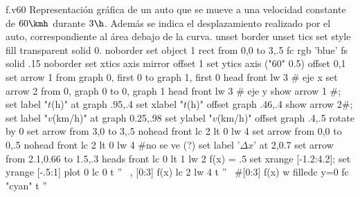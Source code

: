 \begin{plot}{.9}{f.v60}
  {Representación gráfica de un auto que se mueve a una velocidad constante de
  $60\kmh$ durante $3\h$. Además se indica el desplazamiento realizado por el
  auto, correspondiente al área debajo de la curva.}
  unset border
  unset tics
  set style fill transparent solid 0. noborder
  set object 1 rect from 0,0 to 3,.5 fc rgb 'blue' fs solid .15 noborder 
  set xtics axis mirror offset 1
  set ytics axis ("$60$" 0.5) offset 0,1
  set arrow 1 from graph 0, first 0 to graph 1, first 0 head front lw 3 # eje x
  set arrow 2 from 0, graph 0 to 0, graph 1 head front lw 3		# eje y 
  show arrow 1 #; set label "$t$(h)" at graph .95,.4
  set xlabel "$t$(h)" offset  graph .46,.4
  show arrow 2#; set label "$v$(km/h)" at graph 0.25,.98 
  set ylabel "$v$(km/h)" offset graph .4,.5 rotate by 0
  set arrow from 3,0 to 3,.5 nohead front lc 2 lt 0 lw 4
  set arrow from 0,0 to 0,.5 nohead front lc 2 lt 0 lw 4 #no se ve (?)
  set label '$\Delta x$' at 2,0.7
  set arrow from 2.1,0.66 to 1.5,.3 heads front lc 0 lt 1 lw 2
  f(x) = .5
  set xrange [-1.2:4.2]; set yrange [-.5:1]
  plot 0 lc 0 t '' \
  , [0:3] f(x) lc 2 lw 4 t '' \
  #[0:3] f(x) w filledc y=0  fc "cyan" t '' \
\end{plot}


